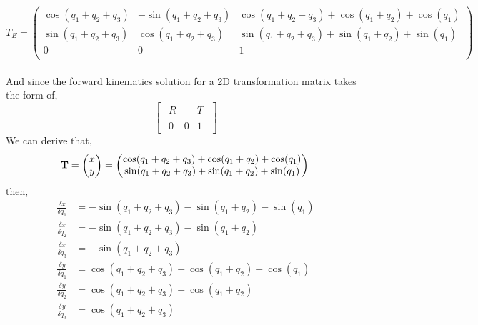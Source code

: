\begin{equation*}
    T_E = \begin{pmatrix}
        \cos(q_1 + q_2 + q_3) & -\sin(q_1 + q_2 + q_3) & \cos(q_1 + q_2 + q_3) + \cos(q_1 + q_2) + \cos(q_1) \\
        \sin(q_1 + q_2 + q_3) & \cos(q_1 + q_2 + q_3)  & \sin(q_1 + q_2 + q_3) + \sin(q_1 + q_2) + \sin(q_1) \\
        0                     & 0                      & 1                                                   \\
    \end{pmatrix}
\end{equation*}
\\
And since the forward kinematics solution for a 2D transformation matrix takes the form of,
\begin{equation*}
    \begin{bmatrix}
        {\begin{array}{cc|c}R&&T\\&&\\\hline 0&0&1\end{array}}
    \end{bmatrix}
\end{equation*}
We can derive that,
\begin{equation*}
    \textbf{T} = \begin{pmatrix}
        x \\ y
    \end{pmatrix} = \begin{pmatrix}
        \cos(q_1 + q_2 + q_3) + \cos(q_1 + q_2) + \cos(q_1) \\
        \sin(q_1 + q_2 + q_3) + \sin(q_1 + q_2) + \sin(q_1)
    \end{pmatrix} \\
\end{equation*}
then,
\begin{equation*}
    \begin{split}
        \frac{\delta x}{\delta q_1} & = -\sin(q_1 + q_2 + q_3) - \sin(q_1 + q_2) - \sin(q_1) \\
        \frac{\delta x}{\delta q_2} & = -\sin(q_1 + q_2 + q_3) - \sin(q_1 + q_2)             \\
        \frac{\delta x}{\delta q_3} & = -\sin(q_1 + q_2 + q_3)                               \\
        \frac{\delta y}{\delta q_1} & =  \cos(q_1 + q_2 + q_3) + \cos(q_1 + q_2) + \cos(q_1) \\
        \frac{\delta y}{\delta q_2} & =  \cos(q_1 + q_2 + q_3) + \cos(q_1 + q_2)             \\
        \frac{\delta y}{\delta q_3} & = \cos(q_1 + q_2 + q_3)
    \end{split}
\end{equation*}
